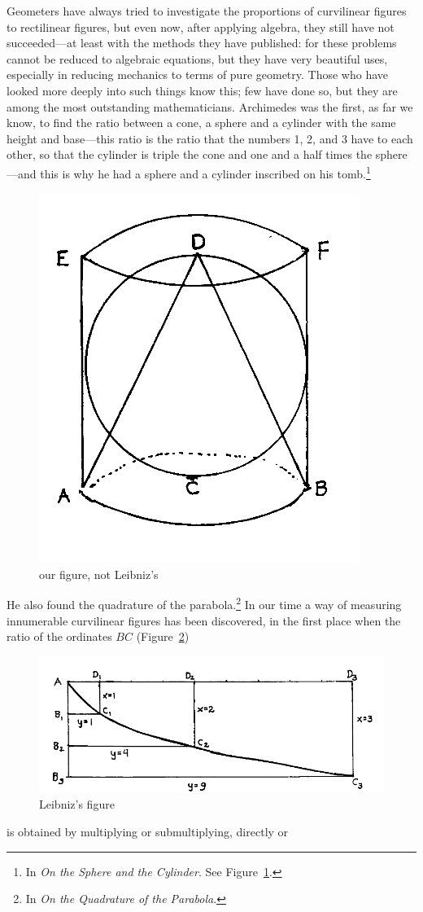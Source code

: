\documentclass[twoside,openright]{article}
\begin{document}
\vspace{2ex}
  
Geometers have always tried to investigate the proportions of
curvilinear figures to rectilinear figures, but even now, after
applying algebra, they still have not succeeded---at least with the
methods they have published: for these problems cannot be reduced to
algebraic equations, but they have very beautiful uses, especially in
reducing mechanics to terms of pure geometry. Those who have looked
more deeply into such things know this; few have done so, but they are
among the most outstanding mathematicians.  Archimedes was the first,
as far we know, to find the ratio between a cone, a sphere and a
cylinder with the same height and base---this ratio is the ratio
that the numbers 1, 2, and 3 have to each other, so that the cylinder
is triple the cone and one and a half times the sphere---and this is
why he had a sphere and a cylinder inscribed on his tomb.\footnote{In
  {\em On the Sphere and the Cylinder}.  See Figure~\ref{archsc}.}
\begin{figure}[htp]
  \begin{center}
    \includegraphics[width=.4\textwidth]{fig/Figure56}
    \caption{our figure, not Leibniz's}
    \label{archsc}
  \end{center}
\end{figure} He also found the quadrature of the parabola.\footnote{In
  {\em On the Quadrature of the Parabola}.}  In our time a way of
measuring innumerable curvilinear figures has been discovered, in the
first place when the ratio of the ordinates $BC$
(Figure~\ref{quadpar})
\begin{figure}[htp]
  \begin{center}
    \includegraphics[width=\textwidth]{fig/Figure57}
    \caption{Leibniz's figure}
    \label{quadpar}
  \end{center}
\end{figure} is obtained by multiplying or submultiplying, directly or
\end{document}
